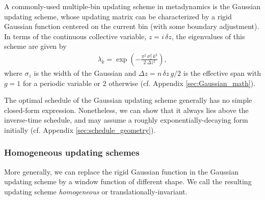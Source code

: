 \documentclass[reprint, superscriptaddress, floatfix]{revtex4-1}
\begin{document}
A commonly-used multiple-bin updating scheme in metadynamics
is the Gaussian updating scheme,
whose updating matrix can be characterized by
a rigid Gaussian function centered on the current bin
(with some boundary adjustment).
%
In terms of the continuous collective variable, $z = i \, \delta z$,
the eigenvalues of this scheme are given by\cite{bussi2006}
\begin{align}
  \lambda_k
  =
  \exp\left(
        -
        \frac{ \pi^2 \, \sigma_z^2 \, k^2 }
             { 2 \, \Delta z^2 }
      \right)
  ,
  \label{eq:lambda_Gaussian}
\end{align}
where $\sigma_z$ is the width of the Gaussian
and $\Delta z = n \, \delta z \, g/2$
is the effective span
with $g = 1$ for a periodic variable or $2$ otherwise
(cf. Appendix \ref{sec:Gaussian_math}).

The optimal schedule of the Gaussian updating scheme
generally has no simple closed-form expression.
Nonetheless, we can show that it always lies above
the inverse-time schedule,
and may assume a roughly exponentially-decaying form
initially (cf. Appendix \ref{sec:schedule_geometry}).




\subsubsection{\label{sec:homo_scheme}
Homogeneous updating schemes}


More generally, we can replace the rigid Gaussian function
in the Gaussian updating scheme
by a window function of different shape.
%
We call the resulting updating scheme
\emph{homogeneous} or
translationally-invariant.
\end{document}
